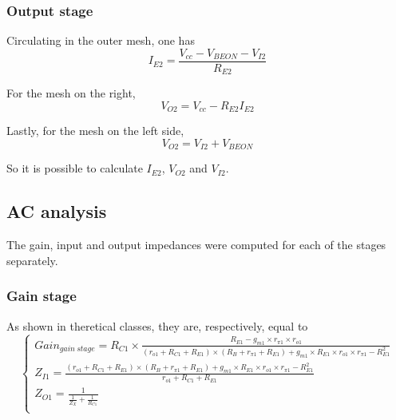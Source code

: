 \subsubsection{Output stage}
Circulating in the outer mesh, one has
\begin{equation}
I_{E2} = \frac{V_{cc}-V_{BEON}-V_{I2}}{R_{E2}}
\end{equation}

For the mesh on the right,
\begin{equation}
V_{O2} = V_{cc} -R_{E2} I_{E2}
\end{equation}

Lastly, for the mesh on the left side,
\begin{equation}
V_{O2} = V_{I2} + V_{BEON}
\end{equation}

So it is possible to calculate $I_{E2}$, $V_{O2}$ and $V_{I2}$.





\subsection{AC analysis}
The gain, input and output impedances were computed for each of the stages separately.

\subsubsection{Gain stage}
As shown in theretical classes, they are, respectively, equal to 
\begin{equation}
\begin{cases}
Gain_{gain \ stage} = R_{C1} \times \frac{R_{E1}-g_{m1} \times r_{\pi 1} \times r_{o1}}{(r_{o1}+R_{C1}+R_{E1})\times(R_B+r_{\pi 1}+R_{E1})+g_{m1} \times R_{E1} \times r_{o1} \times r_{\pi 1} - R_{E1}^2} \\ %
Z_{I1} = \frac{(r_{o1}+R_{C1}+R_{E1}) \times (R_B+r_{\pi 1}+R_{E1}) + g_{m1} \times R_{E1} \times r_{o1} \times r_{\pi 1} - R_{E1}^2}{r_{o1} + R_{C1} + R_{E1}} \\ %
Z_{O1} = \frac{1}{\frac{1}{Z_X}+\frac{1}{R_{C1}}} \\ %
\end{cases}
\end{equation}

